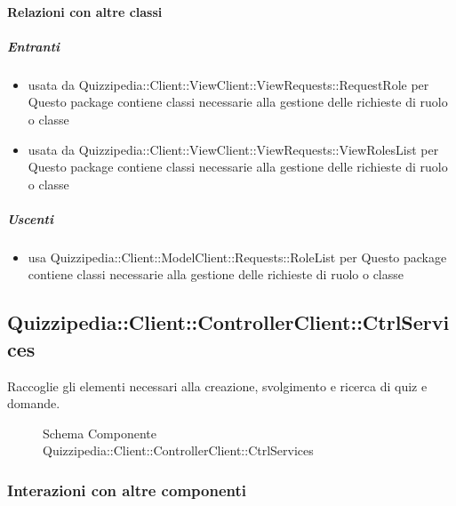 \paragraph{Relazioni con altre classi}
\subparagraph{Entranti}
\begin{itemize}
\item usata da Quizzipedia::Client::ViewClient::ViewRequests::RequestRole per Questo package contiene classi necessarie alla gestione delle richieste di ruolo o classe
\item usata da Quizzipedia::Client::ViewClient::ViewRequests::ViewRolesList per Questo package contiene classi necessarie alla gestione delle richieste di ruolo o classe
\end{itemize}
\subparagraph{Uscenti}
\begin{itemize}
\item usa Quizzipedia::Client::ModelClient::Requests::RoleList per Questo package contiene classi necessarie alla gestione delle richieste di ruolo o classe
\end{itemize}
\subsection{Quizzipedia::Client::ControllerClient::CtrlServices}
Raccoglie gli elementi necessari alla creazione, svolgimento e ricerca di quiz e domande.
\begin{figure}[H]
\centering
\noindent{}
\caption[Schema Componente Quizzipedia::Client::ControllerClient::CtrlServices]{Schema Componente Quizzipedia::Client::ControllerClient::CtrlServices}
\end{figure}
\subsubsection{Interazioni con altre componenti}
